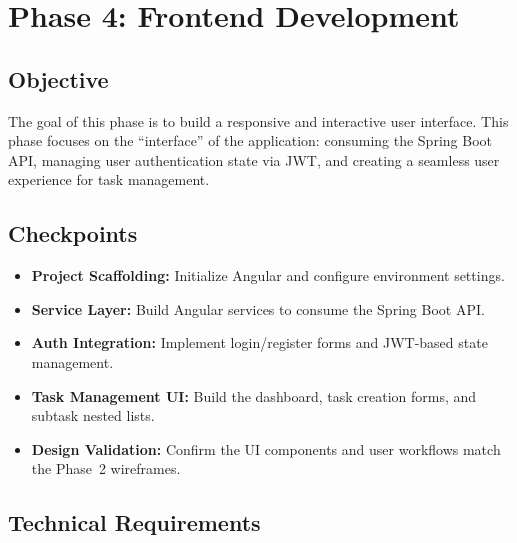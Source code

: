 

\section{Phase 4: Frontend Development}\label{sec:phase4}

\subsection{Objective}
The goal of this phase is to build a responsive and interactive user interface. This phase focuses on
the ``interface'' of the application: consuming the Spring Boot API, managing user authentication
state via JWT, and creating a seamless user experience for task management.

\subsection{Checkpoints}
\begin{itemize}
  \item[$\square$] \textbf{Project Scaffolding:} Initialize Angular and configure environment settings.
  \item[$\square$] \textbf{Service Layer:} Build Angular services to consume the Spring Boot API.
  \item[$\square$] \textbf{Auth Integration:} Implement login/register forms and JWT-based state management.
  \item[$\square$] \textbf{Task Management UI:} Build the dashboard, task creation forms, and subtask nested lists.
  \item[$\square$] \textbf{Design Validation:} Confirm the UI components and user workflows match the Phase~2 wireframes.
\end{itemize}

\subsection{Technical Requirements}

